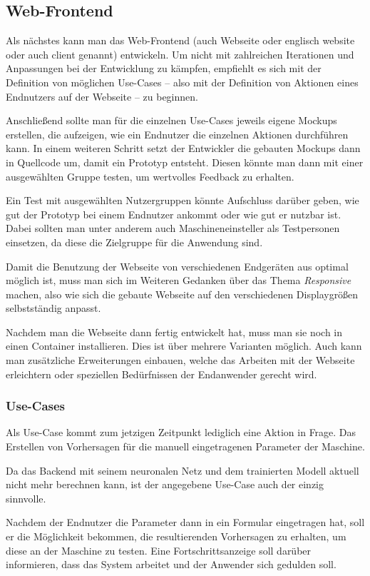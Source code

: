 \subsection{Web-Frontend}
\label{subsec:webseite}
Als nächstes kann man das Web-Frontend (auch Webseite oder englisch website oder auch client genannt) entwickeln. Um
nicht mit zahlreichen Iterationen und Anpassungen bei der Entwicklung zu kämpfen, empfiehlt es sich mit der Definition
von möglichen Use-Cases -- also mit der Definition von Aktionen eines Endnutzers auf der Webseite -- zu beginnen.

Anschließend sollte man für die einzelnen Use-Cases jeweils eigene Mockups erstellen, die aufzeigen, wie ein Endnutzer
die einzelnen Aktionen durchführen kann. In einem weiteren Schritt setzt der Entwickler die gebauten Mockups dann in
Quellcode um, damit ein Prototyp entsteht. Diesen könnte man dann mit einer ausgewählten Gruppe testen, um wertvolles
Feedback zu erhalten.

Ein Test mit ausgewählten Nutzergruppen könnte Aufschluss darüber geben, wie gut der Prototyp bei einem Endnutzer
ankommt oder wie gut er nutzbar ist. Dabei sollten man unter anderem auch Maschineneinsteller als Testpersonen
einsetzen, da diese die Zielgruppe für die Anwendung sind.

Damit die Benutzung der Webseite von verschiedenen Endgeräten aus optimal möglich ist, muss man sich im Weiteren
Gedanken über das Thema \textit{Responsive} machen, also wie sich die gebaute Webseite auf den verschiedenen
Displaygrößen selbstständig anpasst.

Nachdem man die Webseite dann fertig entwickelt hat, muss man sie noch in einen Container installieren. Dies ist über
mehrere Varianten möglich. Auch kann man zusätzliche Erweiterungen einbauen, welche das Arbeiten mit der Webseite
erleichtern oder speziellen Bedürfnissen der Endanwender gerecht wird.

\subsubsection{Use-Cases}
Als Use-Case kommt zum jetzigen Zeitpunkt lediglich eine Aktion in Frage. Das Erstellen von Vorhersagen für die manuell
eingetragenen Parameter der Maschine.

Da das Backend mit seinem neuronalen Netz und dem trainierten Modell aktuell nicht mehr berechnen kann, ist der
angegebene Use-Case auch der einzig sinnvolle.

Nachdem der Endnutzer die Parameter dann in ein Formular eingetragen hat, soll er die Möglichkeit bekommen, die
resultierenden Vorhersagen zu erhalten, um diese an der Maschine zu testen. Eine Fortschrittsanzeige soll darüber
informieren, dass das System arbeitet und der Anwender sich gedulden soll.

